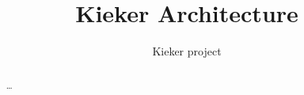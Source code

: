 \documentclass[12pt,journal,a4paper,twocolumn,final,oneside]{IEEEtran}%
\begin{document}
%

\setcounter{page}{1}

\title{%
Kieker Architecture%
}

\author{%
Kieker project
}

\maketitle

\begin{abstract}\small
\ldots
\end{abstract}


\nocite{vanHoornRohrHasselbringWallerEhlersFreyKieselhorst2009TRContinuousMonitoringOfSoftwareServicesDesignAndApplicationOfTheKiekerFramework,RohrHoornMatevskaStoeverSommerGieseckeHasselbring2008KiekerContinuousMonitoringAndOnDemandVisualizationOfJavaSoftwareBehavior}

\end{document}
